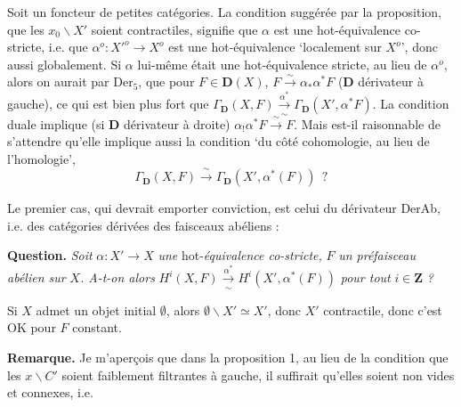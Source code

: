 \documentclass[11pt]{article}
\newcommand{\msp}[1]{\marginpar{\footnotesize [#1]}}
\begin{document}
Soit  un foncteur de petites catégories. La condition suggérée par la proposition, que les $x_0\backslash X'$ soient contractiles, signifie que $\alpha$ est une hot-équivalence co-stricte, i.e. que $\alpha^{o} : X'^{o} \longrightarrow X^{o}$ est une hot-équivalence `localement sur $X^{o}$', donc aussi globalement. Si $\alpha$
\msp{page 5}
lui-même était une hot-équivalence stricte, au lieu de $\alpha^{o}$, alors on aurait par $\mathrm{Der}_5$, que pour $F \in \mathbf{D}(X)$, $F \xrightarrow{\;\sim\;} \alpha_*\alpha^* F$ ($\mathbf{D}$ dérivateur à gauche), ce qui est bien plus fort que $\Gamma_{\mathbf{D}}(X, F) \xrightarrow[\sim]{\alpha^*} \Gamma_{\mathbf{D}}(X', \alpha^* F)$. La condition duale implique (si $\mathbf{D}$ dérivateur à droite) $\alpha_!\alpha^* F \xrightarrow{\;\sim\;} F$. Mais est-il raisonnable de s'attendre qu'elle implique aussi la condition `du côté cohomologie, au lieu de l'homologie',
\[ \Gamma_{\mathbf{D}}(X, F) \xrightarrow{\;\sim\;} \Gamma_{\mathbf{D}}(X', \alpha^*(F)) \ \ ? \]

Le premier cas, qui devrait emporter conviction, est celui du dérivateur DerAb, i.e. des catégories dérivées des faisceaux abéliens :

\textbf{Question.} \textit{Soit} $\alpha : X' \longrightarrow X$ \textit{une} hot-\textit{équivalence co-stricte,} $F$ \textit{un préfaisceau abélien sur} $X$\textit{. A-t-on alors} $H^i(X, F) \xrightarrow[\sim]{\alpha^*} H^i(X', \alpha^*(F))$ \textit{pour tout} $i \in \mathbf{Z}$ \textit{?}

Si $X$ admet un objet initial $\emptyset$, alors $\emptyset\backslash X' \simeq X'$, donc $X'$ contractile, donc c'est OK pour $F$ constant.

\textbf{Remarque.} Je m'aperçois que dans la proposition 1, au lieu de la condition que les $x\backslash C'$ soient faiblement filtrantes à gauche, il suffirait qu'elles soient non vides et connexes, i.e.
\end{document}
